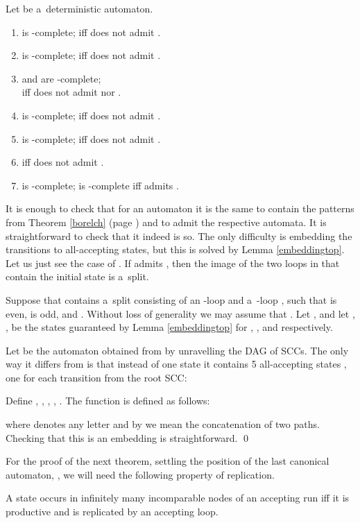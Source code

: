 \documentclass{LMCS}
\begin{document}
\begin{thm} \label{borelautomata} 
Let  be a~deterministic automaton.
\begin{enumerate}[\em(1)]
\item  is -complete;   iff  does not admit .
\item  is  -complete;  iff  does not admit .
\item  and   are -complete; \\  iff  does not admit  nor . 
\item  is -complete;  iff  does not admit .
\item  is -complete;  iff  does not admit . 
\item   iff  does not admit .
\item   is -complete;  is -complete iff  admits .
\end{enumerate}
\end{thm}

\proof It is enough to check that for an automaton it is the same to contain the patterns from Theorem \ref{borelch} (page \pageref{borelch}) and to admit the respective automata. It is straightforward to check that it indeed is so. The only difficulty is embedding the transitions to all-accepting states, but this is solved by Lemma \ref{embeddingtop}. Let us just see the case of . If  admits , then the image of the two loops in   that contain the initial state is a~split. 

Suppose that  contains a~split consisting of an -loop  and a~-loop , such that  is even,  is odd, and . Without loss of generality we may assume that . Let , and let , ,  be the states guaranteed by Lemma \ref{embeddingtop} for , , and  respectively. 

Let  be the automaton obtained from  by unravelling the DAG of SCCs. The only way it differs from  is that instead of one state  it contains 5 all-accepting states , one for each transition from the root SCC: 
  
Define , , , , . The function  is defined as follows:

where  denotes any letter and by  we mean the concatenation of two paths. Checking that this is an embedding is straightforward. \qed

\vspace{5pt}

For the proof of the next theorem, settling the position of the last canonical automaton,  , we will need the following property of replication. 

\begin{lem} \label{replicationlemma} 
A state occurs in infinitely many incomparable nodes of an accepting run iff it is productive and is replicated by an accepting loop. 
\end{lem}
\end{document}

